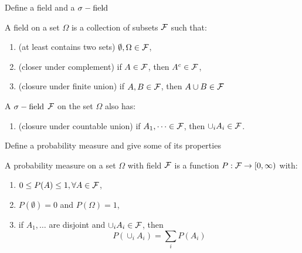 \documentclass[avery5388,grid,frame]{flashcards}
\begin{document}


\begin{flashcard}
    {Define a field and a $\sigma-\text{field}$}
    \begin{definition}
        A field on a set $\Omega$ is a collection of subsets $\mathcal F$ such that:
        \begin{enumerate}
            \item (at least contains two sets) $\emptyset, \Omega \in \mathcal F$,
            \item (closer under complement) if $A \in \mathcal F$, then $A^c \in \mathcal F$,
            \item (closure under finite union) if $A, B \in \mathcal F$, then $A \cup B \in \mathcal F$
        \end{enumerate}
    \end{definition}

    \begin{definition}
        A $\sigma-\text{field}$ $\mathcal F$ on the set $\Omega$ also has:
        \begin{enumerate}[resume]
            \item (closure under countable union) if $A_1, \dots \in \mathcal F$, then $\cup_i A_i \in \mathcal F$.
        \end{enumerate}
    \end{definition}
\end{flashcard}


\begin{flashcard}
    {Define a probability measure and give some of its properties}
    \begin{definition}
        A probability measure on a set $\Omega$ with field $\mathcal F$ is a function $P: \mathcal F \rightarrow [0, \infty)$ with:
        \begin{enumerate}
            \item $0 \leq P(A) \leq 1, \forall A \in \mathcal F$,
            \item $P(\emptyset) = 0$ and $P(\Omega) = 1$,
            \item if $A_1, \dots$ are disjoint and $\cup_i A_i \in \mathcal F$, then
            $$P(\cup_i A_i) = \sum_i P(A_i)$$
        \end{enumerate}
    \end{definition}
\end{flashcard}
\end{document}
